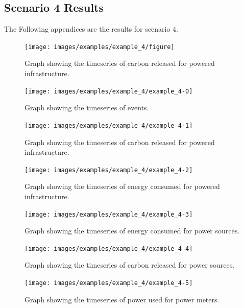 \documentclass{l4proj}
\begin{document}
\begin{appendices}
\section{Scenario 4 Results}\label{apen:subsec:scen4}
The Following appendices are the results for scenario 4.
\clearpage
\begin{figure}[htbp]
    \centering
    \texttt{[image: images/examples/example\_4/figure]}
    ~
    \caption{Graph showing the timeseries of carbon released for powered infrastructure.}
    \label{fig:example2-0}
\end{figure}
\clearpage
\begin{figure}[htbp]
    \centering
    \texttt{[image: images/examples/example\_4/example\_4-0]}
    ~
    \caption{Graph showing the timeseries of events.}
    \label{fig:example4-0}
\end{figure}
\clearpage
\begin{figure}[htbp]
    \centering
    \texttt{[image: images/examples/example\_4/example\_4-1]}
    ~
    \caption{Graph showing the timeseries of carbon released for powered infrastructure.}
    \label{fig:example4-1}
\end{figure}
\clearpage
\begin{figure}[htbp]
    \centering
    \texttt{[image: images/examples/example\_4/example\_4-2]}
    ~
    \caption{Graph showing the timeseries of energy consumed for powered infrastructure.}
    \label{fig:example4-2}
\end{figure}
\clearpage
\begin{figure}[htbp]
    \centering
    \texttt{[image: images/examples/example\_4/example\_4-3]}
    ~
    \caption{Graph showing the timeseries of energy consumed for power sources.}
    \label{fig:example4-3}
\end{figure}
\clearpage
\begin{figure}[htbp]
    \centering
    \texttt{[image: images/examples/example\_4/example\_4-4]}
    ~
    \caption{Graph showing the timeseries of carbon released for power sources.}
    \label{fig:example4-4}
\end{figure}
\clearpage
\begin{figure}[htbp]
    \centering
    \texttt{[image: images/examples/example\_4/example\_4-5]}
    ~
    \caption{Graph showing the timeseries of power used for power meters.}
    \label{fig:example4-5}
\end{figure}


\end{appendices}
\end{document}

